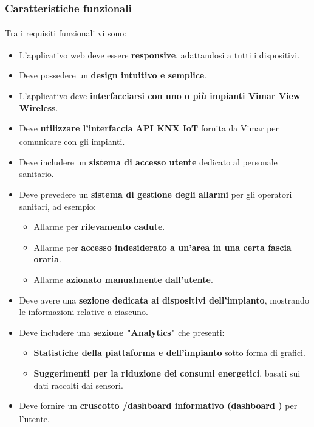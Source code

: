 \documentclass[a4paper,11pt]{article}
\begin{document}
\subsubsection{Caratteristiche funzionali\textsubscript{}
}
Tra i requisiti\textsubscript{}
 funzionali\textsubscript{}
 vi sono:
\begin{itemize}
  \item L'applicativo web deve essere \textbf{responsive}, adattandosi a tutti i dispositivi.
  \item Deve possedere un \textbf{design intuitivo e semplice}.
  \item L'applicativo deve \textbf{interfacciarsi con uno o più impianti Vimar View Wireless}.
  \item Deve \textbf{utilizzare l'interfaccia\textsubscript{} API\textsubscript{} KNX IoT} fornita da Vimar per comunicare con gli impianti.
  \item Deve includere un \textbf{sistema di accesso utente} dedicato al personale sanitario.
  \item Deve prevedere un \textbf{sistema di gestione degli allarmi} per gli operatori sanitari, ad esempio:
  \begin{itemize}
    \item Allarme per \textbf{rilevamento cadute}.
    \item Allarme per \textbf{accesso indesiderato a un'area in una certa fascia oraria}.
    \item Allarme \textbf{azionato manualmente dall'utente}.
  \end{itemize}
  \item Deve avere una \textbf{sezione dedicata ai dispositivi dell'impianto}, mostrando le informazioni relative a ciascuno.
  \item Deve includere una \textbf{sezione "Analytics"} che presenti:
  \begin{itemize}
    \item \textbf{Statistiche della piattaforma e dell'impianto} sotto forma di grafici.
    \item \textbf{Suggerimenti per la riduzione dei consumi energetici}, basati sui dati raccolti dai sensori.
  \end{itemize}
  \item Deve fornire un \textbf{cruscotto\textsubscript{}
/dashboard\textsubscript{}
 informativo (dashboard\textsubscript{}
)} per l'utente.
\end{itemize}
\end{document}
